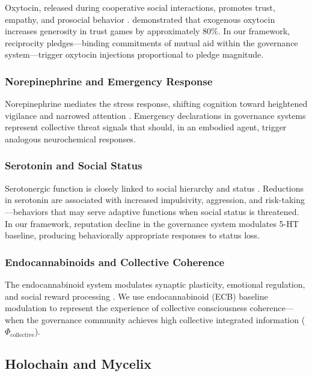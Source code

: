 \documentclass[11pt,a4paper]{article}
\begin{document}
Oxytocin, released during cooperative social interactions, promotes trust, empathy, and prosocial behavior \citep{zak2012moral, kosfeld2005oxytocin}.
\citet{zak2012moral} demonstrated that exogenous oxytocin increases generosity in trust games by approximately 80\%.
In our framework, reciprocity pledges---binding commitments of mutual aid within the governance system---trigger oxytocin injections proportional to pledge magnitude.

\subsubsection{Norepinephrine and Emergency Response}

Norepinephrine mediates the stress response, shifting cognition toward heightened vigilance and narrowed attention \citep{arnsten2009stress, aston2005integrative}.
Emergency declarations in governance systems represent collective threat signals that should, in an embodied agent, trigger analogous neurochemical responses.

\subsubsection{Serotonin and Social Status}

Serotonergic function is closely linked to social hierarchy and status \citep{crockett2009serotonin, raleigh1991serotonergic}.
Reductions in serotonin are associated with increased impulsivity, aggression, and risk-taking---behaviors that may serve adaptive functions when social status is threatened.
In our framework, reputation decline in the governance system modulates 5-HT baseline, producing behaviorally appropriate responses to status loss.

\subsubsection{Endocannabinoids and Collective Coherence}

The endocannabinoid system modulates synaptic plasticity, emotional regulation, and social reward processing \citep{trezza2010endocannabinoid, wei2015endocannabinoid}.
We use endocannabinoid (ECB) baseline modulation to represent the experience of collective consciousness coherence---when the governance community achieves high collective integrated information ($\Phi_{\mathrm{collective}}$).

\subsection{Holochain and Mycelix}
\end{document}
